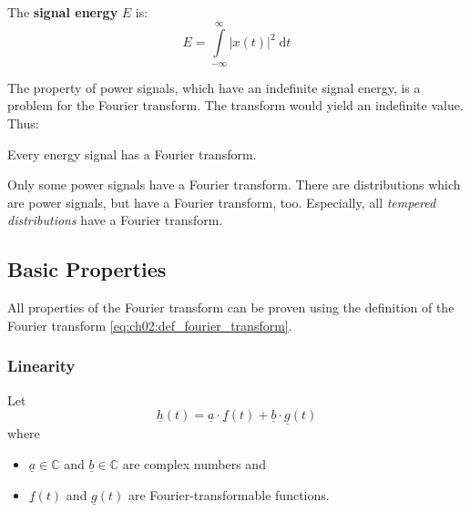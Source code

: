 \begin{refsection}
The  \textbf{signal energy} $E$ is:
\begin{equation}
	E = \int\limits_{-\infty}^{\infty} \left|x(t)\right|^2 \; \mathrm{d} t
\end{equation}%

The property of power signals, which have an indefinite signal energy, is a problem for the Fourier transform. The transform would yield an indefinite value. Thus:
\begin{fact}
	Every energy signal has a Fourier transform.
\end{fact}

Only some power signals have a Fourier transform. There are distributions which are power signals, but have a Fourier transform, too. Especially, all \emph{tempered distributions} have a Fourier transform.

\subsection{Basic Properties}

All properties of the Fourier transform can be proven using the definition of the Fourier transform \eqref{eq:ch02:def_fourier_transform}.

\subsubsection{Linearity}

Let
\begin{equation}
	\underline{h}(t) = \underline{a} \cdot \underline{f}(t) + \underline{b} \cdot \underline{g}(t)
\end{equation}
where
\begin{itemize}
	\item $\underline{a} \in \mathbb{C}$ and $\underline{b} \in \mathbb{C}$ are complex numbers and
	\item $\underline{f}(t)$ and $\underline{g}(t)$ are Fourier-transformable functions.
\end{itemize}


\end{refsection}
